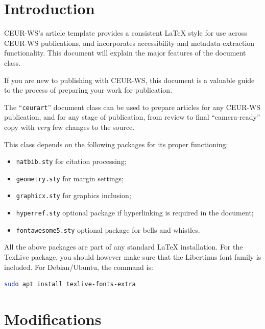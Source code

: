 \documentclass[%
]{ceurart}
\begin{document}
\maketitle

\section{Introduction}

CEUR-WS's article template provides a consistent \LaTeX{} style for use across CEUR-WS publications, and incorporates accessibility and metadata-extraction functionality.
This document will explain the major features of the document class.

If you are new to publishing with CEUR-WS, this document is a valuable guide to the process of preparing your work for publication.

The ``\verb|ceurart|'' document class can be used to prepare articles for any CEUR-WS publication, and for any stage of publication, from review to final ``camera-ready'' copy with {\itshape very} few changes to the source.

This class depends on the following packages for its proper functioning:

\begin{itemize}
\item
\verb|natbib.sty|
 for citation processing;
\item
\verb|geometry.sty|
 for margin settings;
\item
\verb|graphicx.sty|
 for graphics inclusion;
\item
\verb|hyperref.sty|
 optional package if hyperlinking is required in the document;
\item
\verb|fontawesome5.sty|
 optional package for bells and whistles.
\end{itemize}

All the above packages are part of any standard \LaTeX{} installation.
For the TexLive package, you should however make sure that the Libertinus font family is included.
For Debian/Ubuntu, the command is:
\begin{lstlisting}[language=bash]
sudo apt install texlive-fonts-extra
\end{lstlisting}

\section{Modifications}
\end{document}
